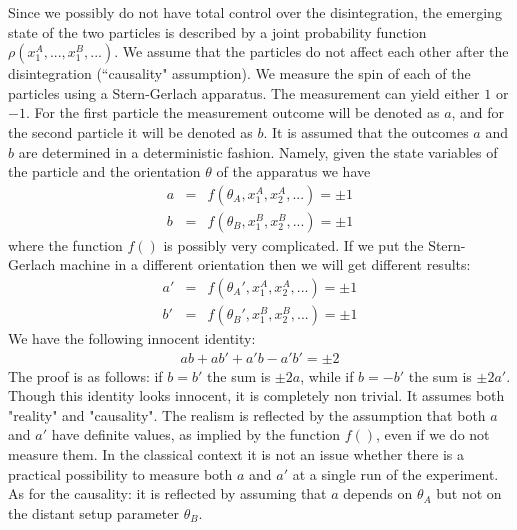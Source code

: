 \documentclass[onecolumn,fleqn, 11pt]{revtex4}
\newcommand{\beq}{\begin{eqnarray}}
\newcommand{\eeq}{\end{eqnarray}}
\begin{document}
Since we possibly do not have total control over the
disintegration, the emerging state of the two particles 
is described  by a joint probability function 
$\rho\left(x^A_1,...,x^B_1,...\right)$.
We assume that the particles do not affect each other  
after the disintegration (``causality" assumption).
We measure the spin of each of the particles using
a Stern-Gerlach apparatus. The measurement can yield
either $1$ or $-1$. For the first particle the measurement 
outcome will be denoted as $a$, and for the second particle 
it will be denoted as $b$.  It is assumed that 
the outcomes $a$ and $b$ are determined in a deterministic 
fashion. Namely, given the state variables of the particle 
and the orientation $\theta$ of the apparatus we have 
\beq
a &=&  f(\theta_A, x^A_1, x^A_2, ... ) = \pm1 
\\ \nonumber
b &=&  f(\theta_B, x^B_1, x^B_2, ... ) = \pm1
\eeq
where the function $f()$ is possibly very complicated. 
If we put the Stern-Gerlach machine in a different orientation 
then we will get different results:
\beq
a' &=&   f\left(\theta_A', x^A_1, x^A_2, ...  \right)=\pm1 
\\ \nonumber
b' &=&   f\left(\theta_B', x^B_1, x^B_2, ...  \right)=\pm1
\eeq
We have the following innocent identity:
\beq
ab+ab'+a'b-a'b' = \pm 2
\eeq
The proof is as follows: if $b=b'$ the sum is $\pm 2a$, 
while if $b=-b'$ the sum is $\pm 2a'$. 
Though this identity looks innocent, it is completely 
non trivial. It assumes both "reality" and "causality".
The realism is reflected by the assumption 
that both $a$ and $a'$ have definite values, 
as implied by the function $f()$, 
even if we do not measure them. 
In the classical context it is not an issue 
whether there is a practical possibility 
to measure both $a$ and $a'$ at a single run 
of the experiment.
As for the causality: it is reflected by assuming 
that $a$ depends on $\theta_A$ but not 
on the distant setup parameter $\theta_B$.   
\end{document}
